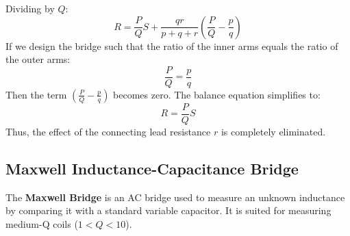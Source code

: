 \documentclass[12pt,a4paper]{article}
\begin{document}
Dividing by $Q$:
\begin{equation}
  R = \frac{P}{Q} S + \frac{q r}{p + q + r} \left( \frac{P}{Q} - \frac{p}{q} \right)
\end{equation}
If we design the bridge such that the ratio of the inner arms equals the ratio of the outer arms:
\begin{equation}
  \frac{P}{Q} = \frac{p}{q}
\end{equation}
Then the term $\left(\frac{P}{Q} - \frac{p}{q}\right)$ becomes zero. The balance equation simplifies to:
\begin{equation}
  R = \frac{P}{Q} S
\end{equation}
Thus, the effect of the connecting lead resistance $r$ is completely eliminated.

\subsection{Maxwell Inductance-Capacitance Bridge}
The \textbf{Maxwell Bridge} is an AC bridge used to measure an unknown inductance by comparing it with a standard variable capacitor. It is suited for measuring medium-Q coils ($1 < Q < 10$).
\end{document}
